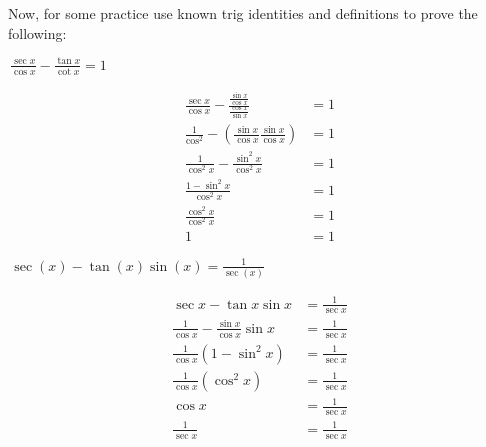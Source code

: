 \documentclass[addpoints]{exam}
\begin{document}
\begin{tcolorbox}[breakable, title=TRIG IDENTITIES, colframe=black, sharp corners, colback=white, colbacktitle=white, coltitle=black]
        \newpage Now, for some practice use known trig identities and definitions to prove the following:
        \begin{questions}
            \question \(\displaystyle\, \frac{\sec x}{\cos x} - \frac{\tan x}{\cot x} = 1\)
            \begin{solution}[\stretch{1}]
                \begin{align*}
                    \frac{\sec x}{\cos x} - \frac{\frac{\sin x}{\cos x}}{\frac{\cos x}{\sin x}} &= 1 \\ 
                    \frac{1}{\cos^2} - \left(\frac{\sin x}{\cos x} \frac{\sin x}{\cos x}\right) &= 1 \\ 
                    \frac{1}{\cos^2 x} - \frac{\sin^2 x}{\cos^2 x} &= 1 \\ 
                    \frac{1 - \sin^2 x}{\cos^2 x} &= 1 \\ 
                    \frac{\cos^2 x}{\cos^2 x} &= 1 \\ 
                    1 &= 1
                \end{align*}
            \end{solution}
            \newpage
            \question \(\displaystyle\, \sec(x)-\tan(x)\sin(x) = \frac{1}{\sec(x)}\)
            \begin{solution}[\stretch{1}]
               \begin{align*}
                 \sec x - \tan x \sin x &= \frac{1}{\sec x} \\ 
                 \frac{1}{\cos x} - \frac{\sin x}{\cos x}\sin x &= \frac{1}{\sec x} \\ 
                 \frac{1}{\cos x} \left(1 - \sin^2 x\right) &= \frac{1}{\sec x} \\ 
                 \frac{1}{\cos x}\left(\cos^2 x\right) &= \frac{1}{\sec x} \\ 
                 \cos x &= \frac{1}{\sec x} \\ 
                 \frac{1}{\sec x} &= \frac{1}{\sec x}
               \end{align*}
            \end{solution}


\end{questions}
\end{tcolorbox}
\end{document}
